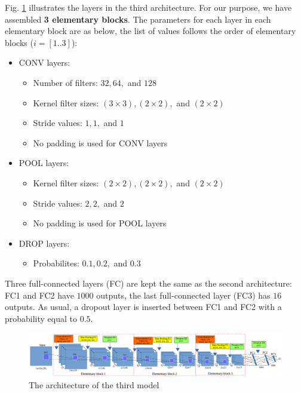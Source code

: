 \documentclass[review]{elsarticle}
\begin{document}
Fig. \ref{fignet3} illustrates the layers in the third architecture. For our purpose, we have assembled \textbf{3 elementary blocks}. The parameters for each layer in each elementary block are as below, the list of values follows the order of elementary blocks ($i = [1..3]$):
\begin{itemize}
	\item CONV layers:
	\begin{itemize}
		\item Number of filters: $32, 64, $ and $128$
		\item Kernel filter sizes: $(3 \times 3), (2 \times 2), $ and $(2 \times 2)$
		\item Stride values: $1, 1, $ and $1$
		\item No padding is used for CONV layers 
	\end{itemize}
	\item POOL layers:
		\begin{itemize}
			\item Kernel filter sizes: $(2 \times 2), (2 \times 2), $ and $(2 \times 2)$
			\item Stride values: $2, 2, $ and $2$
			\item No padding is used for POOL layers
		\end{itemize}
	\item DROP layers:
		\begin{itemize}
			\item Probabilites: $0.1, 0.2, $ and $0.3$
		\end{itemize}
\end{itemize}

Three full-connected layers (FC) are kept the same as the second architecture: FC1 and FC2 have $1000$ outputs, the last full-connected layer (FC3) has $16$ outputs. As usual, a dropout layer is inserted between FC1 and FC2 with a probability equal to $0.5$.
\begin{figure}[h]
	\centering
	\includegraphics[scale=0.2]{images/arch_model}
	\caption{The architecture of the third model}
	\label{fignet3}
\end{figure}
\end{document}
